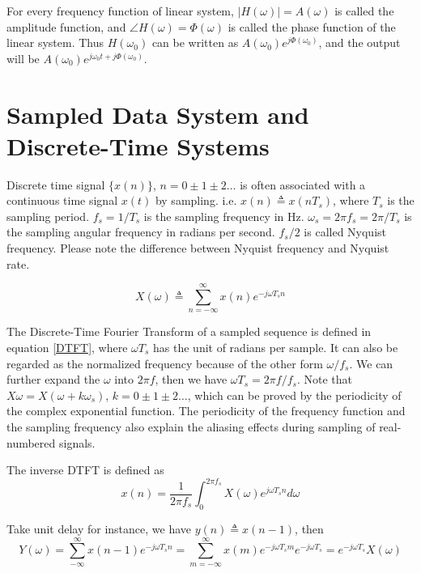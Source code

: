 For every frequency function of linear system, $|{H}(\omega)| = A(\omega)$ is called the amplitude function, 
and $\angle{H}(\omega) = \Phi(\omega)$ is called the phase function of the linear system. 
Thus ${H}(\omega_0)$ can be written as $A(\omega_0)e^{j\Phi(\omega_0)}$, 
and the output will be $A(\omega_0)e^{j\omega_0 t + j\Phi(\omega_0)}$.

\section*{Sampled Data System and Discrete-Time Systems}

Discrete time signal $\{x(n)\}$, $n=0 \pm 1 \pm 2 \dots$ is often associated with a continuous time signal $x(t)$ by sampling.
i.e. $x(n) \triangleq x(n T_s)$, where $T_s$ is the sampling period. $f_s = 1/T_s$ is the sampling
frequency in Hz. $\omega_s = 2\pi f_s = 2\pi / T_s$ is the sampling angular frequency in radians per second. 
$f_s/2$ is called Nyquist frequency. Please note the difference between Nyquist frequency and Nyquist rate.

\begin{equation}
{X}(\omega) \triangleq \sum_{n = -\infty}^{\infty}x(n)e^{-j\omega T_s n}
\label{DTFT}
\end{equation} 

The Discrete-Time Fourier Transform of a sampled sequence is defined in equation \ref{DTFT},
where $\omega T_s$ has the unit of radians per sample. It can also be regarded as the normalized frequency because of the 
other form $\omega/f_s$. We can further expand the $\omega$ into $2\pi f$, then we have $\omega T_s = 2\pi f /f_s$. 
Note that ${X}{\omega} = {X}(\omega + k\omega_s)$, $k = 0 \pm 1 \pm 2 \dots$, which can be proved 
by the periodicity of the complex exponential function. The periodicity of the frequency function and the sampling frequency 
also explain the aliasing effects during sampling of real-numbered signals. 

The inverse DTFT is defined as 
\begin{equation}
x(n) = \frac{1}{2\pi f_s} \int_0^{2\pi f_s} {X}(\omega)e^{j\omega T_s n} d\omega
\end{equation} 

Take unit delay for instance, we have $y(n) \triangleq x(n-1)$, then
\begin{equation}
{Y}(\omega) = \sum_{-\infty}^{\infty}x(n-1)e^{-j\omega T_s n} = 
\sum_{m = -\infty}^{\infty}x(m)e^{-j\omega T_s m} e^{-j\omega T_s}= e^{-j\omega T_s} {X}(\omega)
\label{eq:ftdelay}
\end{equation}

